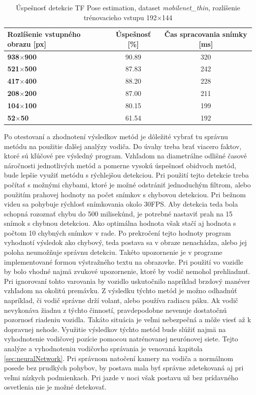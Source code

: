 \documentclass[slovak,master,dept460,male,cpp,cpdeclaration]{diploma}
\begin{document}
\begin{table}[H]
\begin{tabular}{|l|c|c|}
\hline
\textbf{Rozlíšenie vstupného obrazu [px]}        & \textbf{Úspešnosť [\%]}  & \textbf{Čas spracovania snímky [ms]} \\ \hline
\textbf{938$\times$900}      & 90.89     &  320       \\ \hline
\textbf{521$\times$500}      & 87.83     &  242    \\ \hline
\textbf{417$\times$400}      & 88.20     &  228    \\ \hline
\textbf{208$\times$200}      & 87.00     &  211   \\ \hline
\textbf{104$\times$100}      & 80.15     &  199       \\ \hline
\textbf{52$\times$50}       & 61.54    &  192       \\ \hline
\end{tabular}

	\caption{Úspešnosť detekcie TF Pose estimation, dataset \textit{mobilenet\_thin}, rozlíšenie trénovacieho vstupu 192$\times$144}
	\label{tab:tf3}
\end{table}

Po otestovaní a zhodnotení  výsledkov metód  je dôležité vybrať tu správnu metódu na  použitie ďalšej analýzy vodiča. Do úvahy treba brať viacero faktov, ktoré sú kľúčové pre výsledný program. Vzhľadom na diametrálne odlišné časové náročnosti jednotlivých metód a pomerne vysokú úspešnosť obidvoch metód, bude lepšie využiť metódu s rýchlejšou detekciou. Pri použití tejto detekcie treba počítať s možnými chybami, ktoré je možné odstrániť jednoduchým filtrom, alebo použitím  prahovej hodnoty na počet snímkov s chybovou detekciou. Pri bežnom videu sa pohybuje rýchlosť snímkovania okolo 30FPS. Aby detekcia teda  bola schopná rozoznať chybu do 500 milisekúnd, je potrebné nastaviť prah na 15 snímok s chybnou detekciou. Ako optimálna hodnota však stačí aj hodnota s počtom 10 chybných snímkov v rade. Po prekročení tejto hodnoty program vyhodnotí výsledok ako chybový, teda postava sa v obraze nenachádza, alebo jej poloha neumožňuje správnu detekciu. Takéto upozornenie je v programe  implementované formou výstražného textu na obrazovke. Pri použití vo vozidle by bolo vhodné najmä zvukové upozornenie, ktoré by vodič nemohol prehliadnuť.  Pri ignorovaní tohto varovania by vozidlo uskutočnilo napríklad brzdový  manéver  vzhľadom na okolitú premávku. Z výsledku týchto metód je možno odhadnúť napríklad, či vodič správne drží volant, alebo používa radiacu páku. Ak  vodič nevykonáva žiadnu z týchto činností, pravdepodobne nevenuje dostatočnú pozornosť riadeniu vozidla. Takáto situácia je veľmi nebezpečná a môže viesť až k dopravnej nehode. Využitie výsledkov týchto metód bude slúžiť najmä na  vyhodnotenie vodičovej pozície pomocou natrénovanej neurónovej siete. Tejto analýze a vyhodnoteniu  vodičovho správania je venovaná kapitola \ref{sec:neuralNetwork}. Pri správnom natočení kamery na vodiča a normálnom posede bez prudkých pohybov, by postava mala byť správne zdetekovaná aj pri veľmi nízkych podmienkach. Pri jazde v noci však postavu už bez prídavného  osvetlenia nie je možné detekovať.
\end{document}
